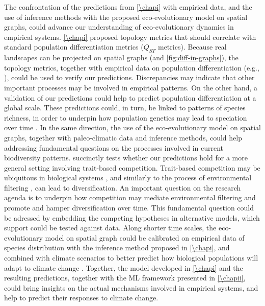 The confrontation of the predictions from \cref{\chapi} with empirical data, and the use of inference methods with the proposed eco-evolutionary model on spatial graphs, could advance our understanding of eco-evolutionary dynamics in empirical systems.
% 
\cref{\chapi} proposed topology metrics that should correlate with standard population differentiation metrics ($Q_{ST}$ metrics). Because real landscapes can be projected on spatial graphs (\xxx and \cref{fig:diff-in-graphs}), the topology metrics, together with empirical data on population differentiation (e.g., \cite{Fluerin}), could be used to verify our predictions. Discrepancies may indicate that other important processes may be involved in empirical patterns. On the other hand, a validation of our predictions could help to predict population differentiation at a global scale. These predictions could, in turn, be linked to patterns of species richness, in order to underpin how population genetics may lead to speciation over time \xxx.
% 
In the same direction, the use of the eco-evolutionary model on spatial graphs, together with paleo-climatic data \citep{HagenXXX} and inference methods, could help addressing fundamental questions on the processes involved in current biodiversity patterns. \Cref{\chapi} succinctly tests whether our predictions hold for a more general setting involving trait-based competition. Trait-based competition may be ubiquitous in biological systems \xxx, and similarly to the process of environmental filtering \xxx, can lead to diversification. An important question on the research agenda is to underpin how competition may mediate environmental filtering and promote and hamper diversification over time. This fundamental question could be adressed by embedding the competing hypotheses in alternative models, which support could be tested against data.
% 
Along shorter time scales, the eco-evolutionary model on spatial graph could be calibrated on empirical data of species distribution \xxx with the inference method proposed in \cref{\chapi}, and combined with climate scenarios \xxx to better predict how biological populations will adapt to climate change \citep{Norberg2012,Urban2016}.
% 
Together, the model developed in \cref{\chapi} and the resulting predictions, together with the ML framework presented in \cref{\chapii}, could bring insights on the actual mechanisms involved in empirical systems, and help to predict their responses to climate change. 




